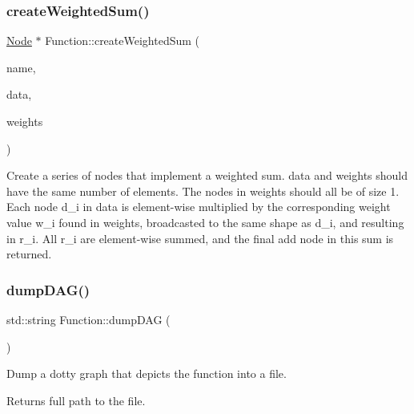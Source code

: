\subsubsection{\texorpdfstring{create\+Weighted\+Sum()}{createWeightedSum()}}
{\footnotesize\ttfamily \hyperlink{classglow_1_1_node}{Node} $\ast$ Function\+::create\+Weighted\+Sum (\begin{DoxyParamCaption}\item[{llvm\+::\+String\+Ref}]{name,  }\item[{llvm\+::\+Array\+Ref$<$ \hyperlink{structglow_1_1_node_value}{Node\+Value} $>$}]{data,  }\item[{llvm\+::\+Array\+Ref$<$ \hyperlink{structglow_1_1_node_value}{Node\+Value} $>$}]{weights }\end{DoxyParamCaption})}

Create a series of nodes that implement a weighted sum. {\ttfamily data} and {\ttfamily weights} should have the same number of elements. The nodes in {\ttfamily weights} should all be of size 1. Each node d\+\_\+i in {\ttfamily data} is element-\/wise multiplied by the corresponding weight value w\+\_\+i found in {\ttfamily weights}, broadcasted to the same shape as d\+\_\+i, and resulting in r\+\_\+i. All r\+\_\+i are element-\/wise summed, and the final add node in this sum is returned. \mbox{\label{classglow_1_1_function_a25f5f7d84157c8c3c20faeb82c083c2d}} 
\subsubsection{\texorpdfstring{dump\+D\+A\+G()}{dumpDAG()}}
{\footnotesize\ttfamily std\+::string Function\+::dump\+D\+AG (\begin{DoxyParamCaption}{ }\end{DoxyParamCaption})}

Dump a dotty graph that depicts the function into a file. \begin{DoxyReturn}{Returns}
full path to the file. 
\end{DoxyReturn}
\mbox{\label{classglow_1_1_function_a0668c5170eedf2b84a292367cfb4fbac}} 
